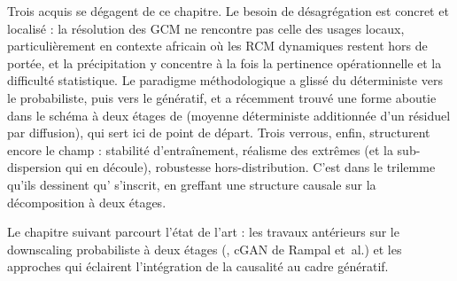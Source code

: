 Trois acquis se dégagent de ce chapitre. Le besoin de désagrégation est concret et localisé : la résolution des GCM ne rencontre pas celle des usages locaux, particulièrement en contexte africain où les RCM dynamiques restent hors de portée, et la précipitation y concentre à la fois la pertinence opérationnelle et la difficulté statistique. Le paradigme méthodologique a glissé du déterministe vers le probabiliste, puis vers le génératif, et a récemment trouvé une forme aboutie dans le schéma à deux étages de \CorrDiff{} (moyenne déterministe additionnée d'un résiduel par diffusion), qui sert ici de point de départ. Trois verrous, enfin, structurent encore le champ : stabilité d'entraînement, réalisme des extrêmes (et la sub-dispersion qui en découle), robustesse hors-distribution. C'est dans le trilemme qu'ils dessinent qu'\Oracle{} s'inscrit, en greffant une structure causale sur la décomposition à deux étages.

Le chapitre suivant parcourt l'état de l'art : les travaux antérieurs sur le downscaling probabiliste à deux étages (\CorrDiff{}, cGAN de Rampal et~al.) et les approches qui éclairent l'intégration de la causalité au cadre génératif.

